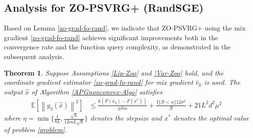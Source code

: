 \documentclass{article}
\newcommand*{\E}{\mathbb{E}}
\newcommand{\norm}[1]{\left\lVert#1\right\rVert}
\newtheorem{theorem}{Theorem}[section]
\theoremstyle{definition}
\theoremstyle{remark}
\begin{document}
\subsection{Analysis for ZO-PSVRG+ (RandSGE)}
Based on Lemma \ref{zo-grad-fo-rand}, we indicate that ZO-PSVRG+ using the mix gradient \eqref{zo-grad-fo-rand} achieves significant improvements both in the convergence rate and the function query complexity, as demonstrated in the subsequent analysis.
\begin{theorem}\label{noncon-zoo-rand}
Suppose Assumptions \ref{Lip-Zoo} and \ref{Var-Zoo} hold, and the coordinate gradient estimator \eqref{zo-grad-fo-rand} for mix gradient $\hat{v}_k$ is used. The output $\hat{x}$ of Algorithm \ref{APGnonconvex-Algo} satisfies
  \begin{equation}\label{eq-noncon-zoo-rand}
  \begin{split}
\E[\norm{g_{\eta}(\hat{x})}^2] & \leq \frac{6\left(F(x_0) - F({x}^*)\right)}{\eta Sm} + \frac{I\{\mathcal{B} < n\}12\sigma ^2}{\mathcal{B}}+21{L^2 d^2 \mu^2}
\end{split}
 \end{equation}
where $\eta = \min\{\frac{1}{8L}, \frac{\sqrt{b}}{12mL\sqrt{d}}\}$ denotes the stepsize and $x^*$ denotes the optimal value of problem \ref{problem}.
\end{theorem}
\end{document}
